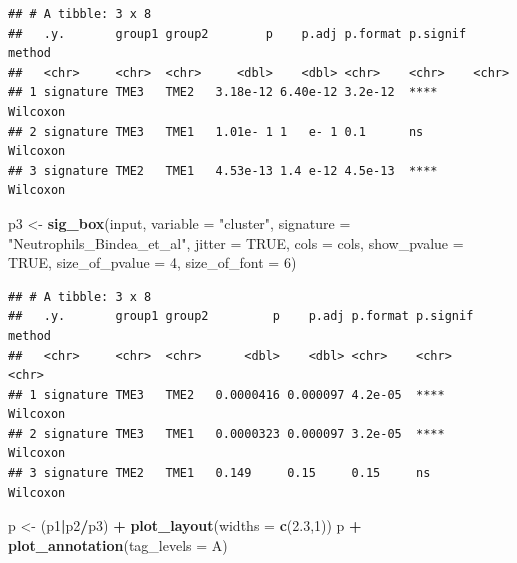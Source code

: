 \documentclass[
  12pt,
]{book}
\newenvironment{Shaded}{\begin{snugshade}}{\end{snugshade}}
\newcommand{\AttributeTok}[1]{\textcolor[rgb]{0.13,0.29,0.53}{#1}}
\newcommand{\ConstantTok}[1]{\textcolor[rgb]{0.56,0.35,0.01}{#1}}
\newcommand{\DecValTok}[1]{\textcolor[rgb]{0.00,0.00,0.81}{#1}}
\newcommand{\FloatTok}[1]{\textcolor[rgb]{0.00,0.00,0.81}{#1}}
\newcommand{\FunctionTok}[1]{\textcolor[rgb]{0.13,0.29,0.53}{\textbf{#1}}}
\newcommand{\NormalTok}[1]{#1}
\newcommand{\OtherTok}[1]{\textcolor[rgb]{0.56,0.35,0.01}{#1}}
\newcommand{\SpecialCharTok}[1]{\textcolor[rgb]{0.81,0.36,0.00}{\textbf{#1}}}
\newcommand{\StringTok}[1]{\textcolor[rgb]{0.31,0.60,0.02}{#1}}
\begin{document}
\begin{verbatim}
## # A tibble: 3 x 8
##   .y.       group1 group2        p    p.adj p.format p.signif method  
##   <chr>     <chr>  <chr>     <dbl>    <dbl> <chr>    <chr>    <chr>   
## 1 signature TME3   TME2   3.18e-12 6.40e-12 3.2e-12  ****     Wilcoxon
## 2 signature TME3   TME1   1.01e- 1 1   e- 1 0.1      ns       Wilcoxon
## 3 signature TME2   TME1   4.53e-13 1.4 e-12 4.5e-13  ****     Wilcoxon
\end{verbatim}

\begin{Shaded}
\begin{Highlighting}[]
\NormalTok{p3 }\OtherTok{\textless{}{-}} \FunctionTok{sig\_box}\NormalTok{(input, }\AttributeTok{variable =} \StringTok{"cluster"}\NormalTok{, }\AttributeTok{signature =} \StringTok{"Neutrophils\_Bindea\_et\_al"}\NormalTok{,  }
              \AttributeTok{jitter =} \ConstantTok{TRUE}\NormalTok{, }\AttributeTok{cols =}\NormalTok{  cols, }\AttributeTok{show\_pvalue =} \ConstantTok{TRUE}\NormalTok{, }\AttributeTok{size\_of\_pvalue =} \DecValTok{4}\NormalTok{, }\AttributeTok{size\_of\_font =} \DecValTok{6}\NormalTok{)}
\end{Highlighting}
\end{Shaded}

\begin{verbatim}
## # A tibble: 3 x 8
##   .y.       group1 group2         p    p.adj p.format p.signif method  
##   <chr>     <chr>  <chr>      <dbl>    <dbl> <chr>    <chr>    <chr>   
## 1 signature TME3   TME2   0.0000416 0.000097 4.2e-05  ****     Wilcoxon
## 2 signature TME3   TME1   0.0000323 0.000097 3.2e-05  ****     Wilcoxon
## 3 signature TME2   TME1   0.149     0.15     0.15     ns       Wilcoxon
\end{verbatim}

\begin{Shaded}
\begin{Highlighting}[]
\NormalTok{p }\OtherTok{\textless{}{-}}\NormalTok{ (p1}\SpecialCharTok{|}\NormalTok{p2}\SpecialCharTok{/}\NormalTok{p3) }\SpecialCharTok{+} \FunctionTok{plot\_layout}\NormalTok{(}\AttributeTok{widths =} \FunctionTok{c}\NormalTok{(}\FloatTok{2.3}\NormalTok{,}\DecValTok{1}\NormalTok{))}
\NormalTok{p }\SpecialCharTok{+} \FunctionTok{plot\_annotation}\NormalTok{(}\AttributeTok{tag\_levels =} \StringTok{\textquotesingle{}A\textquotesingle{}}\NormalTok{)}
\end{Highlighting}
\end{Shaded}
\end{document}
